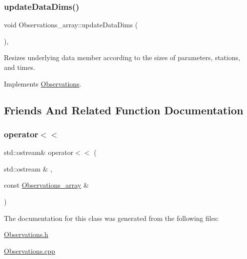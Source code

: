 \mbox{\label{class_observations__array_aa9364c4356d1f8a2b430c93a1fcd021f}} 
\subsubsection{\texorpdfstring{update\+Data\+Dims()}{updateDataDims()}}
{\footnotesize\ttfamily void Observations\+\_\+array\+::update\+Data\+Dims (\begin{DoxyParamCaption}{ }\end{DoxyParamCaption})\hspace{0.3cm}{\ttfamily [override]}, {\ttfamily [virtual]}}

Resizes underlying data member according to the sizes of parameters, stations, and times. 

Implements \mbox{\hyperlink{class_observations_aab0540879c2d3fdf5f91d30ea2f902fd}{Observations}}.



\subsection{Friends And Related Function Documentation}
\mbox{\label{class_observations__array_affb01c6a2af2ae2b833f7edec435234d}} 
\subsubsection{\texorpdfstring{operator$<$$<$}{operator<<}}
{\footnotesize\ttfamily std\+::ostream\& operator$<$$<$ (\begin{DoxyParamCaption}\item[{std\+::ostream \&}]{,  }\item[{const \mbox{\hyperlink{class_observations__array}{Observations\+\_\+array}} \&}]{ }\end{DoxyParamCaption})\hspace{0.3cm}{\ttfamily [friend]}}



The documentation for this class was generated from the following files\+:\begin{DoxyCompactItemize}
\item 
\mbox{\hyperlink{_observations_8h}{Observations.\+h}}\item 
\mbox{\hyperlink{_observations_8cpp}{Observations.\+cpp}}\end{DoxyCompactItemize}

